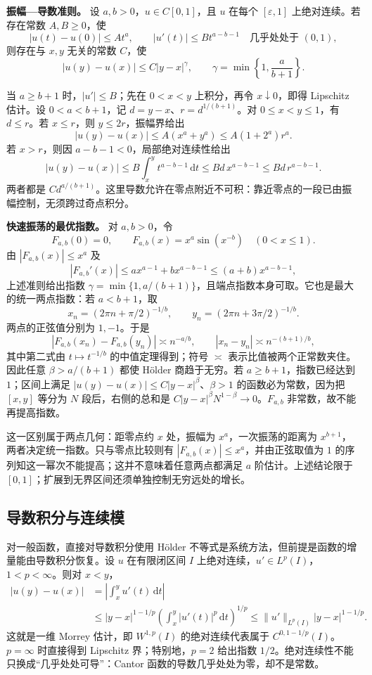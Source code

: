 \documentclass[12pt,fontset=fandol]{ctexart}
\begin{document}
\textbf{振幅---导数准则。} 设 $a,b>0$，$u\in C[0,1]$，且 $u$ 在每个 $[\varepsilon,1]$ 上绝对连续。若存在常数 $A,B\ge0$，使
\[
|u(t)-u(0)|\le At^a,\qquad
|u'(t)|\le Bt^{a-b-1}\quad\text{几乎处处于 }(0,1),
\]
则存在与 $x,y$ 无关的常数 $C$，使
\[
|u(y)-u(x)|\le C|y-x|^\gamma,
\qquad \gamma=\min\left\{1,\frac a{b+1}\right\}.
\]

当 $a\ge b+1$ 时，$|u'|\le B$；先在 $0<x<y$ 上积分，再令 $x\downarrow0$，即得 Lipschitz 估计。设 $0<a<b+1$，记 $d=y-x$、$r=d^{1/(b+1)}$。对 $0\le x<y\le1$，有 $d\le r$。若 $x\le r$，则 $y\le2r$，振幅界给出
\[
|u(y)-u(x)|\le A(x^a+y^a)
\le A(1+2^a)r^a.
\]
若 $x>r$，则因 $a-b-1<0$，局部绝对连续性给出
\[
|u(y)-u(x)|\le B\int_x^yt^{a-b-1}\,\mathrm dt
\le Bd\,x^{a-b-1}\le Bd\,r^{a-b-1}.
\]
两者都是 $C d^{a/(b+1)}$。这里导数允许在零点附近不可积：靠近零点的一段已由振幅控制，无须跨过奇点积分。

\textbf{快速振荡的最优指数。} 对 $a,b>0$，令
\[
F_{a,b}(0)=0,\qquad F_{a,b}(x)=x^a\sin(x^{-b})\quad(0<x\le1).
\]
由 $|F_{a,b}(x)|\le x^a$ 及
\[
|F_{a,b}'(x)|
\le a x^{a-1}+b x^{a-b-1}
\le(a+b)x^{a-b-1},
\]
上述准则给出指数 $\gamma=\min\{1,a/(b+1)\}$，且端点指数本身可取。它也是最大的统一两点指数：若 $a<b+1$，取
\[
x_n=(2\pi n+\pi/2)^{-1/b},\qquad
y_n=(2\pi n+3\pi/2)^{-1/b}.
\]
两点的正弦值分别为 $1,-1$。于是
\[
|F_{a,b}(x_n)-F_{a,b}(y_n)|\asymp n^{-a/b},
\qquad |x_n-y_n|\asymp n^{-(b+1)/b},
\]
其中第二式由 $t\mapsto t^{-1/b}$ 的中值定理得到；符号 $\asymp$ 表示比值被两个正常数夹住。因此任意 $\beta>a/(b+1)$ 都使 Hölder 商趋于无穷。若 $a\ge b+1$，指数已经达到 $1$；区间上满足 $|u(y)-u(x)|\le C|y-x|^\beta$、$\beta>1$ 的函数必为常数，因为把 $[x,y]$ 等分为 $N$ 段后，右侧的总和是 $C|y-x|^\beta N^{1-\beta}\to0$。$F_{a,b}$ 非常数，故不能再提高指数。

这一区别属于两点几何：距零点约 $x$ 处，振幅为 $x^a$，一次振荡的距离为 $x^{b+1}$，两者决定统一指数。只与零点比较则有 $|F_{a,b}(x)|\le x^a$，并由正弦取值为 $1$ 的序列知这一幂次不能提高；这并不意味着任意两点都满足 $a$ 阶估计。上述结论限于 $[0,1]$；扩展到无界区间还须单独控制无穷远处的增长。

\subsection{导数积分与连续模}

\label{app:estimate-derivative}

对一般函数，直接对导数积分使用 Hölder 不等式是系统方法，但前提是函数的增量能由导数积分恢复。设 $u$ 在有限闭区间 $I$ 上绝对连续，$u'\in L^p(I)$，$1<p<\infty$。则对 $x<y$，
\[
\begin{aligned}
|u(y)-u(x)|
&=\left|\int_x^yu'(t)\,\mathrm dt\right|\\
&\le |y-x|^{1-1/p}
\left(\int_x^y|u'(t)|^p\,\mathrm dt\right)^{1/p}
\le\|u'\|_{L^p(I)}|y-x|^{1-1/p}.
\end{aligned}
\]
这就是一维 Morrey 估计，即 $W^{1,p}(I)$ 的绝对连续代表属于 $C^{0,1-1/p}(I)$。$p=\infty$ 时直接得到 Lipschitz 界；特别地，$p=2$ 给出指数 $1/2$。绝对连续性不能只换成“几乎处处可导”：Cantor 函数的导数几乎处处为零，却不是常数。
\end{document}

